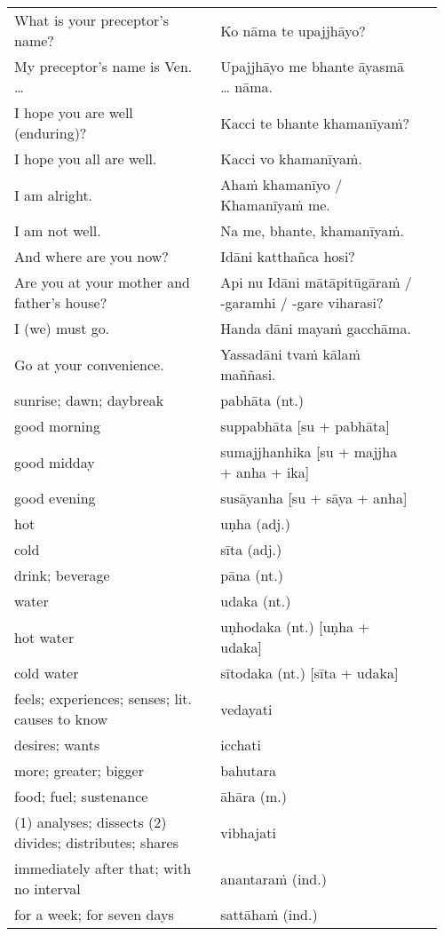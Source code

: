 \documentclass[a5paper]{memoir}
\begin{document}
\begin{longtable}{L{0.48\linewidth} L{0.48\linewidth} H}
What is your preceptor's name? & Ko nāma te upajjhāyo? & \\[0pt]
My preceptor's name is Ven. \ldots{} & Upajjhāyo me bhante āyasmā \ldots{} nāma. & \\[0pt]
I hope you are well (enduring)? & Kacci te bhante khamanīyaṁ? & \\[0pt]
I hope you all are well. & Kacci vo khamanīyaṁ. & \\[0pt]
I am alright. & Ahaṁ khamanīyo / Khamanīyaṁ me. & \\[0pt]
I am not well. & Na me, bhante, khamanīyaṁ. & \\[0pt]
And where are you now? & Idāni katthañca hosi? & \\[0pt]
Are you at your mother and father's house? & Api nu Idāni mātāpitūgāraṁ / -garamhi / -gare viharasi? & \\[0pt]
I (we) must go. & Handa dāni mayaṁ gacchāma. & \\[0pt]
Go at your convenience. & Yassadāni tvaṁ kālaṁ maññasi. & \\[0pt]
sunrise; dawn; daybreak & pabhāta (nt.) & \\[0pt]
good morning & suppabhāta [su + pabhāta] & \\[0pt]
good midday & sumajjhanhika [su + majjha + anha + ika] & \\[0pt]
good evening & susāyanha [su + sāya + anha] & \\[0pt]
hot & uṇha (adj.) & \\[0pt]
cold & sīta (adj.) & \\[0pt]
drink; beverage & pāna (nt.) & \\[0pt]
water & udaka (nt.) & \\[0pt]
hot water & uṇhodaka (nt.) [uṇha + udaka] & \\[0pt]
cold water & sītodaka (nt.) [sīta + udaka] & \\[0pt]
feels; experiences; senses; lit. causes to know & vedayati & \\[0pt]
desires; wants & icchati & \\[0pt]
more; greater; bigger & bahutara & \\[0pt]
food; fuel; sustenance & āhāra (m.) & \\[0pt]
(1) analyses; dissects (2) divides; distributes; shares & vibhajati & \\[0pt]
immediately after that; with no interval & anantaraṁ (ind.) & \\[0pt]
for a week; for seven days & sattāhaṁ (ind.) & \\[0pt]

\end{longtable}
\end{document}
